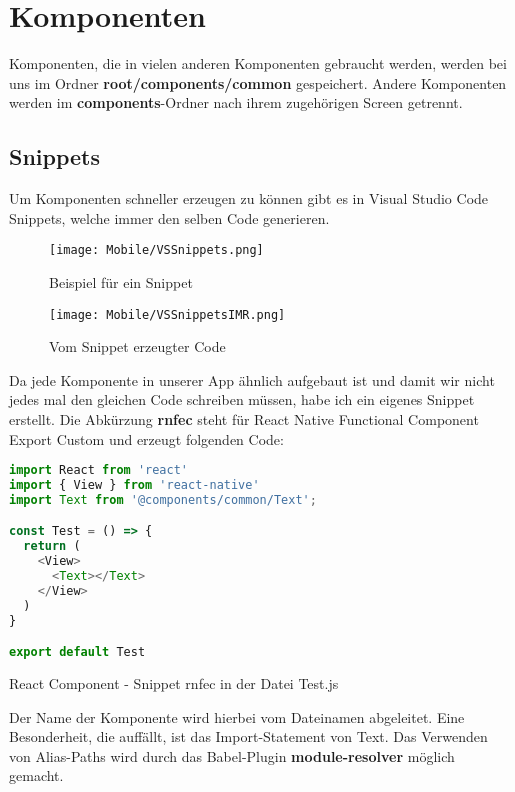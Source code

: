 \section{Komponenten}
Komponenten, die in vielen anderen Komponenten gebraucht werden, werden bei uns im Ordner
\textbf{root/components/common} gespeichert. Andere Komponenten werden im \textbf{components}-Ordner nach ihrem
zugehörigen Screen getrennt.

\subsection{Snippets}
Um Komponenten schneller erzeugen zu können gibt es in Visual Studio Code Snippets, welche immer den
selben Code generieren.

\begin{figure}[H]
  \begin{center}
    \texttt{[image: Mobile/VSSnippets.png]}
    \caption{Beispiel für ein Snippet}
  \end{center}
\end{figure}

\begin{figure}[H]
  \begin{center}
    \texttt{[image: Mobile/VSSnippetsIMR.png]}
    \caption{Vom Snippet erzeugter Code}
  \end{center}
\end{figure}

Da jede Komponente in unserer App ähnlich aufgebaut ist und damit wir nicht jedes mal den gleichen
Code schreiben müssen, habe ich ein eigenes Snippet erstellt. Die Abkürzung \textbf{rnfec} steht für
React Native Functional Component Export Custom und erzeugt folgenden Code:

\begin{code}[htp]
\begin{lstlisting}[firstnumber=1,language=JavaScript, style=JSX]
import React from 'react'
import { View } from 'react-native'
import Text from '@components/common/Text';

const Test = () => {
  return (
    <View>
      <Text></Text>
    </View>
  )
}

export default Test
\end{lstlisting}
\caption{React Component - Snippet rnfec in der Datei Test.js}
\end{code}

Der Name der Komponente wird hierbei vom Dateinamen abgeleitet. Eine Besonderheit, die auffällt, ist
das Import-Statement von Text. Das Verwenden von Alias-Paths wird durch das Babel-Plugin
\textbf{module-resolver} möglich gemacht.

